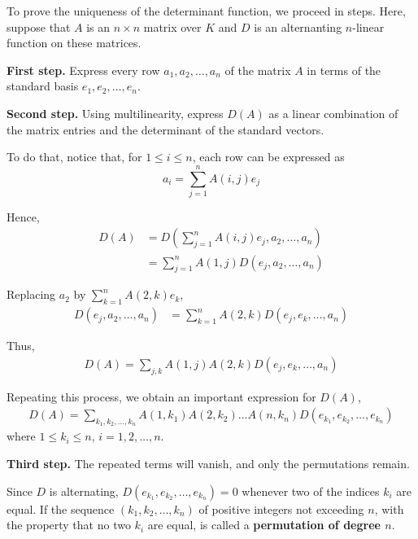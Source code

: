 To prove the uniqueness of the determinant function, we proceed in steps. Here, suppose that $A$ is an $n \times n$ matrix over $K$ and $D$ is an alternanting $n$-linear function on these matrices.

\textbf{First step.} Express every row $a_1, a_2, \ldots, a_n$ of the matrix $A$ in terms of the standard basis $e_1, e_2, \ldots, e_n$.

\textbf{Second step.} Using multilinearity, express $D(A)$ as a linear combination of the matrix entries and the determinant of the standard vectors.

To do that, notice that, for $1 \leq i \leq n$, each row can be expressed as
\[
	a_i = \sum_{j=1}^n A(i,j)e_j
\]

Hence,
\begin{equation*}
	\begin{aligned}
		D(A) &= D\left( \sum_{j=1}^n A(i,j)e_j, a_2, \ldots, a_n \right) \\
			 &= \sum_{j=1}^n A(1,j)D(e_j, a_2, \ldots, a_n)
	\end{aligned}
\end{equation*}

Replacing $a_2$ by $\sum_{k=1}^n A(2,k)e_k$, 
\begin{equation*}
	\begin{aligned}
		D(e_j, a_2, \ldots, a_n) &= \sum_{k=1}^n A(2,k)D(e_j, e_k, \ldots, a_n)
	\end{aligned}
\end{equation*}

Thus,
\begin{equation*}
	\begin{aligned}
		D(A) = \sum_{j,k}A(1,j)A(2,k)D(e_j, e_k, \ldots, a_n)
	\end{aligned}
\end{equation*}

Repeating this process, we obtain an important expression for $D(A)$, 
\begin{equation*}
	\begin{aligned}
		D(A) = \sum_{k_1,k_2, \ldots, k_n} A(1,k_1)A(2,k_2) \ldots A(n,k_n) D(e_{k_1},e_{k_2},\ldots, e_{k_n})
	\end{aligned}
\end{equation*}
where $1 \leq k_i \leq n$, $i = 1, 2, \ldots, n$.

\textbf{Third step.} The repeated terms will vanish, and only the permutations remain.

Since $D$ is alternating, $D(e_{k_1},e_{k_2},\ldots, e_{k_n}) = 0$ whenever two of the indices $k_i$ are equal. If the sequence $(k_1, k_2, \ldots, k_n)$ of positive integers not exceeding $n$, with the property that no two $k_i$ are equal, is called a \textbf{permutation of degree $n$}.

